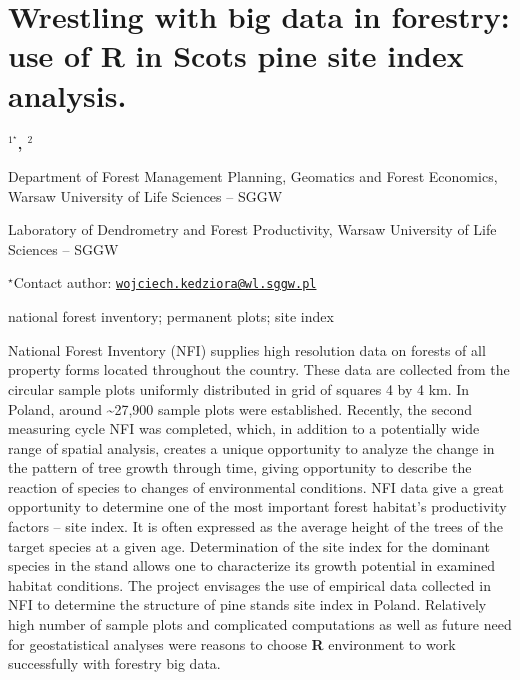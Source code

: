\documentclass[\main/boa.tex]{subfiles}
\begin{document}
\section{Wrestling with big data in forestry: use of R in Scots pine site index
analysis.}

\begin{center}
  {\bf {}$^{1^\star}$, $^{2}$}
\end{center}

\vskip 0.3cm

\begin{affiliations}
\begin{enumerate}
\begin{minipage}{0.915\textwidth}
\centering
\item Department of Forest Management Planning, Geomatics and Forest
Economics, Warsaw University of Life Sciences -- SGGW \\[-2pt]
\item Laboratory of Dendrometry and Forest Productivity, Warsaw University of
Life Sciences -- SGGW \\[-2pt]
\end{minipage}
\end{enumerate}
$^\star$Contact author: \href{mailto:wojciech.kedziora@wl.sggw.pl}{\nolinkurl{wojciech.kedziora@wl.sggw.pl}}\\
\end{affiliations}

\vskip 0.5cm

\begin{minipage}{0.915\textwidth}
\keywords national forest inventory; permanent plots; site index
\end{minipage}

\vskip 0.8cm

National Forest Inventory (NFI) supplies high resolution data on forests
of all property forms located throughout the country. These data are
collected from the circular sample plots uniformly distributed in grid
of squares 4 by 4 km. In Poland, around \textasciitilde{}27,900 sample
plots were established. Recently, the second measuring cycle NFI was
completed, which, in addition to a potentially wide range of spatial
analysis, creates a unique opportunity to analyze the change in the
pattern of tree growth through time, giving opportunity to describe the
reaction of species to changes of environmental conditions. NFI data
give a great opportunity to determine one of the most important forest
habitat's productivity factors -- site index. It is often expressed as
the average height of the trees of the target species at a given age.
Determination of the site index for the dominant species in the stand
allows one to characterize its growth potential in examined habitat
conditions. The project envisages the use of empirical data collected in
NFI to determine the structure of pine stands site index in Poland.
Relatively high number of sample plots and complicated computations as
well as future need for geostatistical analyses were reasons to choose
\textbf{R} environment to work successfully with forestry big data.
\end{document}
